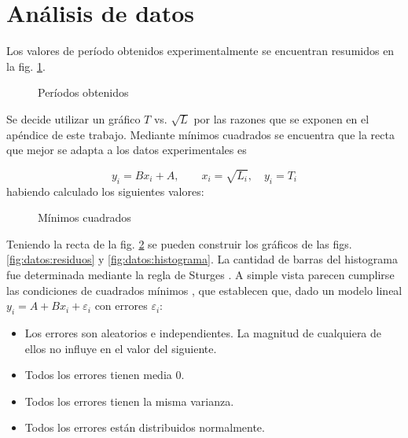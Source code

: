 \section{Análisis de datos}


Los valores de período obtenidos experimentalmente se encuentran resumidos en
la fig. \ref{fig:datos:periodos}.

\begin{figure}[H]
    \centering
    
    \caption{Períodos obtenidos}
    \label{fig:datos:periodos}
\end{figure}

Se decide utilizar un gráfico $T$ vs. $\sqrt{L}$ por las razones que se 
exponen en el apéndice de este trabajo. Mediante mínimos cuadrados se encuentra
que la recta que mejor se adapta a los datos experimentales es

\[
    y_i = Bx_i + A, \quad\quad x_i = \sqrt{L_i}, \quad y_i = T_i
\]
habiendo calculado los siguientes valores:

\begin{itemize}
    
\end{itemize}


\begin{figure}[H]
    \centering
    
    \caption{Mínimos cuadrados}
    \label{fig:datos:regresion}
\end{figure}

Teniendo la recta de la fig. \ref{fig:datos:regresion} se pueden construir los
gráficos de las figs. \ref{fig:datos:residuos} y \ref{fig:datos:histograma}.
La cantidad de barras del histograma fue determinada mediante la regla de 
Sturges \cite{sturges}.
A simple vista parecen cumplirse las condiciones de cuadrados mínimos 
\cite[pág. 527]{estadistica}, que establecen que, dado un modelo lineal
$y_i = A + Bx_i + \varepsilon_i$ con errores $\varepsilon_i$:

\begin{itemize}
    \item Los errores son aleatorios e independientes. La magnitud de 
        cualquiera de ellos no influye en el valor del siguiente.
    \item Todos los errores tienen media 0.
    \item Todos los errores tienen la misma varianza.
    \item Todos los errores están distribuidos normalmente.
\end{itemize}

